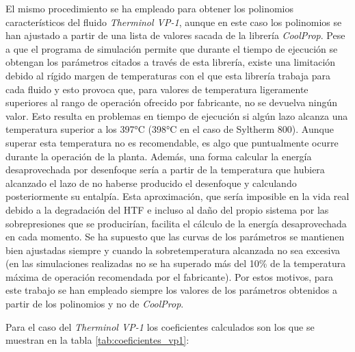 El mismo procedimiento se ha empleado para obtener los polinomios característicos del fluido \emph{Therminol VP-1}, aunque en este caso los polinomios se han ajustado a partir de una lista de valores sacada de la librería \emph{CoolProp}. Pese a que el programa de simulación permite que durante el tiempo de ejecución se obtengan los parámetros citados a través de esta librería, existe una limitación debido al rígido margen de temperaturas con el que esta librería trabaja para cada fluido y esto
provoca que, para valores de temperatura ligeramente superiores al rango de operación ofrecido por fabricante, no se devuelva ningún valor. Esto resulta en problemas en tiempo de ejecución si algún lazo alcanza una temperatura superior a los 397°C (398°C en el caso de Syltherm 800). Aunque superar esta temperatura no es recomendable, es algo que puntualmente ocurre durante la operación de la planta. Además, una forma calcular la energía desaprovechada por desenfoque sería a partir de la temperatura que hubiera alcanzado el lazo de no haberse producido el desenfoque y calculando posteriormente su entalpía. Esta aproximación, que sería imposible en la vida real debido a la degradación del HTF e incluso al daño del propio sistema por las sobrepresiones que se producirían, facilita el cálculo de la energía desaprovechada en cada  momento. Se ha supuesto que las curvas de los parámetros se mantienen bien ajustadas siempre y cuando la sobretemperatura alcanzada no sea excesiva (en las simulaciones realizadas no se ha superado más del 10\% de la temperatura máxima de operación recomendada por el fabricante). Por estos motivos, para este trabajo se han empleado siempre los valores de los parámetros obtenidos a partir de los polinomios y no de \emph{CoolProp}.

Para el caso del \emph{Therminol VP-1} los coeficientes calculados son los que se muestran en la tabla \ref{tab:coeficientes_vp1}:

